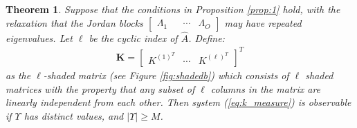 \documentclass[letterpaper,12pt,peerreviewca,draftcls]{IEEEtran}
\newtheorem{theorem}{Theorem}%
\newcommand{\empK}{\ensuremath{K}}
\newcommand{\ncent}{M}
\newcommand{\eqlabel}[1]{\label{eq:#1}}
\renewcommand{\eqref}[1]{(\ref{eq:#1})}
\newcommand{\JorMul}{O}
\newcommand{\Tset}{\Upsilon}
\newcommand{\JorLa}{\Lambda}
\newcommand{\minmeas}{\ell}
\newcommand{\dualop}{A}
\newcommand{\dualopApprox}{\widehat{\dualop}}
\newcommand{\empKShadFull}{\mathbf{\empK}}
\begin{document}
\begin{theorem}\label{thm:1}
 Suppose that the conditions in Proposition \ref{prop:1} hold, with the relaxation that the Jordan blocks $\begin{bmatrix}\JorLa_1 & &\cdots & \JorLa_{\JorMul}\end{bmatrix}$ may have repeated eigenvalues. Let $\minmeas$ be the cyclic index of $\dualopApprox$. Define:
 \begin{align}\eqlabel{empKShadFull}
  \empKShadFull = \left[\begin{smallmatrix}
                    \empK^{{(1)}^T} & 
                    \cdots &
                    \empK^{{(\minmeas)}^T}
                  \end{smallmatrix}\right]^T
 \end{align}
 as the \emph{$\minmeas$-shaded matrix} (see Figure \ref{fig:shadedb}) which consists of $\minmeas$ shaded matrices with the property that any subset of
 $\minmeas$
 columns in the matrix are linearly independent from each
 other. Then system \eqref{k_measure} is observable if $\Tset$ has distinct values, and $|\Tset| \geq \ncent$.
\end{theorem}
\end{document}
